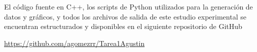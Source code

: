 El código fuente en C++, los scripts de Python utilizados para la generación de datos y gráficos, y todos los archivos de salida de este estudio experimental se encuentran estructurados y disponibles en el siguiente repositorio de GitHub

\vspace{0.3cm}

\url{https://github.com/agomezrr/Tarea1Agustin}